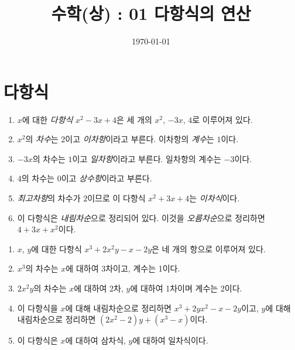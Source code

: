 \documentclass{oblivoir}
\begin{document}
\title{수학(상) : 01 다항식의 연산}
\author{}
\date{\today}
\maketitle
\tableofcontents
\newpage

\section{다항식}

%
\begin{enumerate}[(1)]
\item
\(x\)에 대한 \emph{다항식} \(x^2-3x+4\)은 세 개의  \(x^2\), \(-3x\), \(4\)로 이루어져 있다.
\item
\(x^2\)의 \emph{차수}는 \(2\)이고 \emph{이차항}이라고 부른다.
이차항의 \emph{계수}는 \(1\)이다.
\item
\(-3x\)의 차수는 \(1\)이고 \emph{일차항}이라고 부른다.
일차항의 계수는 \(-3\)이다.
\item
\(4\)의 차수는 \(0\)이고 \emph{상수항}이라고 부른다.
\item
\emph{최고차항}의 차수가 \(2\)이므로 이 다항식 \(x^2+3x+4\)는 \emph{이차식}이다.
\item
이 다항식은 \emph{내림차순}으로 정리되어 있다.
이것을 \emph{오름차순}으로 정리하면 \(4+3x+x^2\)이다.
\end{enumerate}

%
\begin{enumerate}[(1)]
\item
\(x\), \(y\)에 대한 다항식 \(x^3+2x^2y-x-2y\)은 네 개의 항으로 이루어져 있다.
\item
\(x^3\)의 차수는 \(x\)에 대하여 3차이고, 계수는 1이다.
\item
\(2x^2y\)의 차수는 \(x\)에 대하여 2차, \(y\)에 대하여 1차이며 계수는 2이다.
\item
이 다항식을 \(x\)에 대해 내림차순으로 정리하면 \(x^3+2yx^2-x-2y\)이고, \(y\)에 대해 내림차순으로 정리하면 \((2x^2-2)y+(x^3-x)\)이다.
\item
이 다항식은 \(x\)에 대하여 삼차식, \(y\)에 대하여 일차식이다.
\end{enumerate}

\newpage
%
\vspace{-20pt}
\tabd
{}
{}
{}
{}
{}
\end{document}
